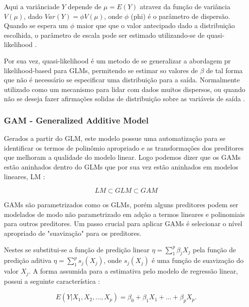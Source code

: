 \documentclass[
	12pt,				%
	openright,			%
	oneside,			%
	a4paper,			%
	english,			%
	brazil				%
	]{abntex2}
\begin{document}
Aqui a variânciade $Y$ depende de $\mu = E(Y)$ atravez da função de variância $V(\mu)$, dado $Var(Y) = \phi V(\mu)$, onde $\phi$ (phi)
é o parâmetro de dispersão. Quando se espera um $\phi$ maior que que o valor antecipado dado a distribuição escolhida, o parâmetro de
escala pode ser estimado utilizando-se de quasi-likelihood \cite{GAMeGLM_especie_estudo}.

Por sua vez, quasi-likelihood é um metodo de se generalizar a abordagem pr likelihood-based para GLMs, permitendo se estimar so valores
de $\beta$ de tal forma que não é necessário se especificar uma distribuição para a saída. Normalmente utilizado como um mecanismo
para lidar com dados muitos dispersos, ou quando não se deseja fazer afirmações solidas de distribuição sobre as variáveis de saída 
\cite{quase-likehood}.

\subsubsection{GAM - Generalized Additive Model}

Gerados a partir do GLM, este modelo possue uma automatização para se identificar os termos de polinômio apropriado
e as transformações dos preditores que melhoram a qualidade do modelo linear. Logo podemos dizer que os GAMs estão
aninhados dentro do GLMs que por sua vez estão aninhados em modelos lineares, LM \cite{GAMeGLM_especie_estudo}:

\begin{equation}
	LM \subset GLM \subset GAM
\end{equation}

GAMs são parametrizados como os GLMs, porém alguns preditores podem ser modelados de modo não parametrizado em 
adção a termos lineares e polinomiais para outros preditores. Um passo crucial para aplicar GAMs é selecionar
o nível apropriado de "suavização" para os preditores.

Nestes se substitui-se a função de predição linear $\eta = \sum_{1}^{p}\beta_jX_j$ pela função de predição aditiva 
$\eta = \sum_{1}^{p}s_j(X_j)$, onde $s_j(X_j)$ é uma função de suavização do valor $X_j$. A forma assumida
para a estimativa pelo modelo de regressão linear, possui a seguinte característica \cite{GAM}:

\begin{equation}
	\label{reg_linear_estimativa}
	E(Y|X_1,X_2,...,X_p) = \beta_0 + \beta_1X_1 + ... + \beta_pX_p.
\end{equation}
\end{document}
